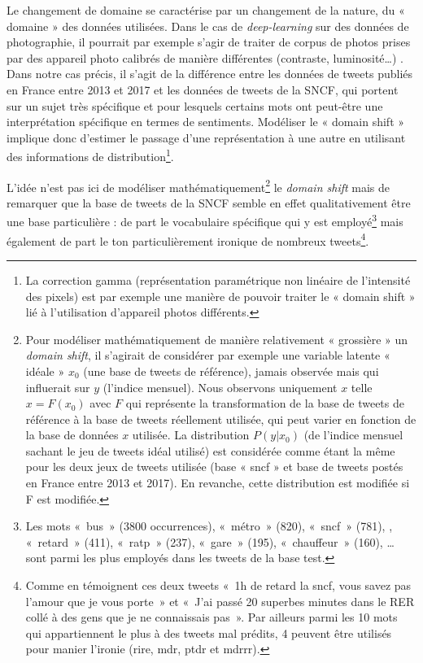 \documentclass[11pt,french,french]{article}
\let\rmarkdownfootnote\footnote%
\def\footnote{\protect\rmarkdownfootnote}
\begin{document}
Le changement de domaine se caractérise par un changement de la nature, du « domaine » des données utilisées.
Dans le cas de \emph{deep-learning} sur des données de photographie, il pourrait par exemple s'agir de traiter de corpus de photos prises par des appareil photo calibrés de manière différentes (contraste, luminosité\dots) .
Dans notre cas précis, il s'agit de la différence entre les données de tweets publiés en France entre 2013 et 2017 et les données de tweets de la SNCF, qui portent sur un sujet très spécifique et pour lesquels certains mots ont peut-être une interprétation spécifique en termes de sentiments.
Modéliser le « domain shift » implique donc d'estimer le passage d'une représentation à une autre en utilisant des informations de distribution\footnote{La correction gamma (représentation paramétrique non linéaire de l’intensité des pixels) est par exemple une manière de pouvoir traiter le « domain shift » lié à l’utilisation d’appareil photos différents.}.

L'idée n'est pas ici de modéliser mathématiquement\footnote{Pour modéliser mathématiquement de manière relativement « grossière » un \emph{domain shift}, il s'agirait de considérer par exemple une variable latente « idéale » \(x_0\) (une base de tweets de référence), jamais observée mais qui influerait sur \(y\) (l'indice mensuel). Nous observons uniquement \(x\) telle \(x=F(x_0)\) avec \(F\) qui représente la transformation de la base de tweets de référence à la base de tweets réellement utilisée, qui peut varier en fonction de la base de données \(x\) utilisée. La distribution \(P(y|x_0)\) (de l'indice mensuel sachant le jeu de tweets idéal utilisé) est considérée comme étant la même pour les deux jeux de tweets utilisée (base « sncf » et base de tweets postés en France entre 2013 et 2017). En revanche, cette distribution est modifiée si F est modifiée.} le \emph{domain shift} mais de remarquer que la base de tweets de la SNCF semble en effet qualitativement être une base particulière : de part le vocabulaire spécifique qui y est employé\footnote{Les mots «~bus~» (3800 occurrences), «~métro~» (820), «~sncf~» (781), , «~retard~» (411), «~ratp~» (237), «~gare~» (195), «~chauffeur~» (160), \ldots{} sont parmi les plus employés dans les tweets de la base test.} mais également de part le ton particulièrement ironique de nombreux tweets\footnote{Comme en témoignent ces deux tweets «~1h de retard la sncf, vous savez pas l'amour que je vous porte~» et «~J'ai passé 20 superbes minutes dans le RER collé à des gens que je ne connaissais pas~». Par ailleurs parmi les 10 mots qui appartiennent le plus à des tweets mal prédits, 4 peuvent être utilisés pour manier l'ironie (rire, mdr, ptdr et mdrrr).}.
\end{document}

